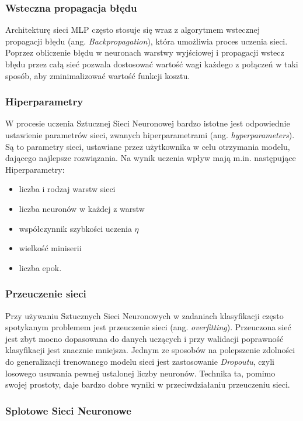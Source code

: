 \subsubsection{Wsteczna propagacja błędu}
Architekturę sieci MLP często stosuje się wraz z algorytmem wstecznej 
propagacji błędu (ang. \emph{Backpropagation}), która umożliwia proces uczenia sieci. Poprzez obliczenie błędu w neuronach warstwy wyjściowej i propagacji 
wstecz błędu przez całą sieć pozwala dostosować wartość wagi każdego z połączeń
w taki sposób, aby zminimalizować wartość funkcji kosztu.


\subsubsection{Hiperparametry}
W procesie uczenia Sztucznej Sieci Neuronowej bardzo istotne jest odpowiednie ustawienie parametrów sieci, zwanych hiperparametrami (ang. \emph{hyperparameters}). Są to parametry sieci, ustawiane przez użytkownika w celu otrzymania modelu, dającego najlepsze rozwiązania. Na wynik uczenia wpływ mają m.in. następujące Hiperparametry:
\begin{itemize}
  \item liczba i rodzaj warstw sieci
  \item liczba neuronów w każdej z warstw
  \item współczynnik szybkości uczenia $\eta$
  \item wielkość miniserii
  \item liczba epok.
\end{itemize}

\subsubsection{Przeuczenie sieci}

Przy używaniu Sztucznych Sieci Neuronowych w zadaniach klasyfikacji często spotykanym problemem jest przeuczenie sieci (ang. \emph{overfitting}). Przeuczona sieć jest zbyt mocno dopasowana do danych uczących i przy walidacji poprawność klasyfikacji jest znacznie mniejsza. Jednym ze sposobów na polepszenie zdolności do generalizacji trenowanego modelu sieci jest zastosowanie \emph{Dropoutu}, czyli losowego usuwania pewnej ustalonej liczby neuronów. Technika ta, pomimo swojej prostoty, daje bardzo dobre wyniki w przeciwdziałaniu przeuczeniu sieci.  


\subsubsection{Splotowe Sieci Neuronowe}

